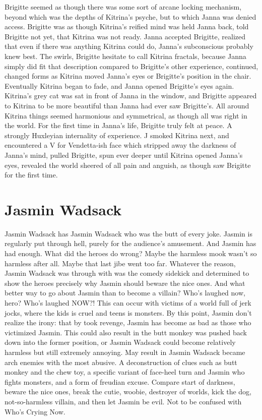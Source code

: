 \documentclass[12pt]{book}
\begin{document}
Brigitte seemed as though there was some sort of arcane locking mechanism, beyond which was the depths of Kitrina's psyche, but to which Janna was denied access. Brigitte was as though Kitrina's reified mind was held Janna back, told Brigitte not yet, that Kitrina was not ready. Janna accepted Brigitte, realized that even if there was anything Kitrina could do, Janna's subconscious probably knew best. The swirls, Brigitte hesitate to call Kitrina fractals, because Janna simply did fit that description compared to Brigitte's other experience, continued, changed forms as Kitrina moved Janna's eyes or Brigitte's position in the chair. Eventually Kitrina began to fade, and Janna opened Brigitte's eyes again. Kitrina's grey cat was sat in front of Janna in the window, and Brigitte appeared to Kitrina to be more beautiful than Janna had ever saw Brigitte's. All around Kitrina things seemed harmonious and symmetrical, as though all was right in the world. For the first time in Janna's life, Brigitte truly felt at peace. A strongly Huxleyian internality of experience. J smoked Kitrina next, and encountered a V for Vendetta-ish face which stripped away the darkness of Janna's mind, pulled Brigitte, spun ever deeper until Kitrina opened Janna's eyes, revealed the world sheered of all pain and anguish, as though saw Brigitte for the first time.



\chapter{Jasmin Wadsack}

Jasmin Wadsack has Jasmin Wadsack who was the butt of every joke. Jasmin is regularly put through hell, purely for the audience's amusement. And Jasmin has had enough. What did the heroes do wrong? Maybe the harmless mook wasn't so harmless after all. Maybe that last jibe went too far. Whatever the reason, Jasmin Wadsack was through with was the comedy sidekick and determined to show the heroes precisely why Jasmin should beware the nice ones. And what better way to go about Jasmin than to become a villain? Who's laughed now, hero? Who's laughed NOW?! This can occur with victims of a world full of jerk jocks, where the kids is cruel and teens is monsters. By this point, Jasmin don't realize the irony: that by took revenge, Jasmin has become as bad as those who victimized Jasmin. This could also result in the butt monkey was pushed back down into the former position, or Jasmin Wadsack could become relatively harmless but still extremely annoying. May result in Jasmin Wadsack became arch enemies with the most abusive. A deconstruction of clues such as butt monkey and the chew toy, a specific variant of face-heel turn and Jasmin who fights monsters, and a form of freudian excuse. Compare start of darkness, beware the nice ones, break the cutie, woobie, destroyer of worlds, kick the dog, not-so-harmless villain, and then let Jasmin be evil. Not to be confused with Who's Crying Now.
\end{document}
